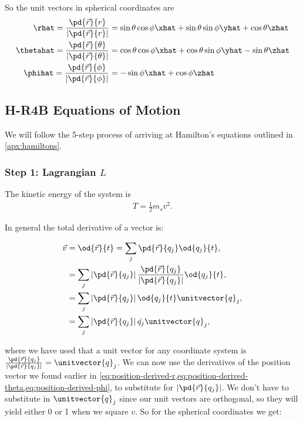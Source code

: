 So the unit vectors in spherical coordinates are
\begin{align}
    \rhat = \dfrac{\pd{\vec{r}}{r}}{\left| \pd{\vec{r}}{r} \right| } &= \sin{\theta}\cos{\phi} \xhat + \sin{\theta}\sin{\phi} \yhat + \cos{\theta} \zhat \label{eq:r-hat}\\
    \thetahat = \dfrac{\pd{\vec{r}}{\theta}}{\left| \pd{\vec{r}}{\theta} \right| } &= \cos{\theta}\cos{\phi} \xhat + \cos{\theta}\sin{\phi} \yhat - \sin{\theta} \zhat \label{eq:theta-hat}\\
    \phihat = \dfrac{\pd{\vec{r}}{\phi}}{\left| \pd{\vec{r}}{\phi} \right| } &= -\sin{\phi} \xhat + \cos{\phi} \zhat \label{eq:phi-hat}
\end{align}

\subsection{H-R4B Equations of Motion}
We will follow the 5-step process of arriving at Hamilton's equations outlined in \cref{apx:hamiltons}.

\subsubsection{Step 1: Lagrangian \(L\)}
The kinetic energy of the system is
\begin{align}
    T = \frac{1}{2} m_s v^2.
\end{align}

In general the total derivative of a vector is:

\begin{align}
    \vec{v} &= \od{\vec{r}}{t} = \sum\limits_{j} \pd{\vec{r}}{q_j} \od{q_j}{t}, \\
      &= \sum\limits_{j} \left|\pd{\vec{r}}{q_j}\right| \frac{\pd{\vec{r}}{q_j}}{\left|\pd{\vec{r}}{q_j}\right|} \od{q_j}{t}, \\
      &= \sum\limits_{j} \left|\pd{\vec{r}}{q_j}\right| \od{q_j}{t} \unitvector{q}_j, \\
      &= \sum\limits_{j} \left|\pd{\vec{r}}{q_j}\right| \dot{q_j} \unitvector{q}_j,
    \end{align}

where we have used that a unit vector for any coordinate system is \(\frac{\pd{\vec{r}}{q_j}}{\left|\pd{\vec{r}}{q_j}\right|} = \unitvector{q}_j\).
We can now use the derivatives of the position vector we found earlier in \cref{eq:position-derived-r,eq:position-derived-theta,eq:position-derived-phi}, to substitute for \(\left|\pd{\vec{r}}{q_j}\right|\). We don't have to substitute in \(\unitvector{q}_j\) since our unit vectors are orthogonal, so they will yield either 0 or 1 when we square \(v\). So for the spherical coordinates we get:

